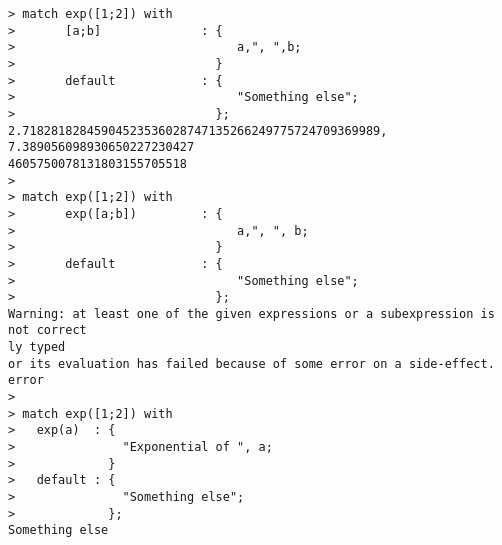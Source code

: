 \begin{center}\begin{minipage}{15cm}\begin{Verbatim}[frame=single]
> match exp([1;2]) with 
>       [a;b]              : {
>                               a,", ",b;
>                            }
>       default            : {
>                               "Something else";
>                            };
2.71828182845904523536028747135266249775724709369989, 7.389056098930650227230427
4605750078131803155705518
> 
> match exp([1;2]) with 
>       exp([a;b])         : {
>                               a,", ", b;
>                            }
>       default            : {
>                               "Something else";
>                            };
Warning: at least one of the given expressions or a subexpression is not correct
ly typed
or its evaluation has failed because of some error on a side-effect.
error
> 
> match exp([1;2]) with 
>   exp(a)  : {
>               "Exponential of ", a;
>             }
>   default : {
>               "Something else";
>             };
Something else
\end{Verbatim}
\end{minipage}\end{center}
